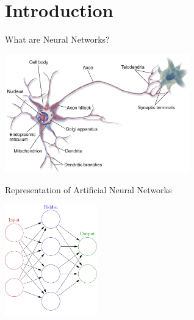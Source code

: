 \setlength{\parskip}{\baselineskip}
\section{Introduction}


\begin{frame}{What are Neural Networks?}
	\begin{center}
		\includegraphics[width=0.6\textwidth]{../Images/CNNArchitectures/Biological-Neuron.png}\\
	\end{center}
\end{frame}

\begin{frame}{Representation of Artificial Neural Networks}
	\begin{center}
		\includegraphics[width=0.3\textwidth]{../Images/CNNArchitectures/simplified-neural-network-graph.png}\\
	\end{center}
\end{frame}

